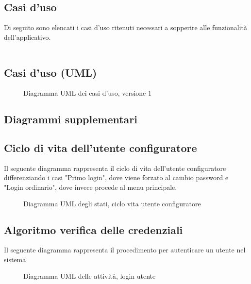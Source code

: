 \subsection{Casi d'uso}
Di seguito sono elencati i casi d'uso ritenuti necessari a sopperire alle funzionalità
dell'applicativo.
\\\\





\pagebreak
\subsection{Casi d'uso (UML)}
\vspace{0.5cm}
\begin{figure}[H]
    \centering
    \caption{Diagramma UML dei casi d'uso, versione 1}
    \label{fig:use_case_uml_v1}
\end{figure}

\pagebreak
\subsection{Diagrammi supplementari}
\subsection{Ciclo di vita dell'utente configuratore}
Il seguente diagramma rappresenta il ciclo di vita dell'utente configuratore differenziando i casi "Primo login", dove 
viene forzato al cambio password e "Login ordinario", dove invece procede al menu principale.
\vspace{0.5cm}
\begin{figure}[H]
    \centering
    \caption{Diagramma UML degli stati, ciclo  vita utente configuratore}
    \label{fig:states_config_user_lifecycle}
\end{figure}

\pagebreak
\subsection{Algoritmo verifica delle credenziali}
Il seguente diagramma rappresenta il procedimento per autenticare un utente nel sistema
\vspace{0.5cm}
\begin{figure}[H]
    \centering
    \caption{Diagramma UML delle attività, login utente}
    \label{fig:activity_user_login}
\end{figure}

